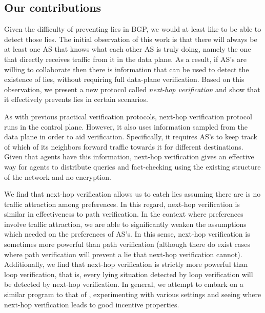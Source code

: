 \documentclass[10pt]{article}
\begin{document}
  \subsection{Our contributions}
    Given the difficulty of preventing lies in BGP,
    we would at least like to be able to detect those lies.
    The initial observation of this work is that
    there will always be at least one AS that knows what each
    other AS is truly doing, namely the one that directly receives traffic from
    it in the data plane.
    As a result, if AS's are willing to collaborate then there is
    information that can be used to detect the existence of lies, without
    requiring full data-plane verification.
    Based on this observation, we present a new protocol called
    \emph{next-hop verification}
    and show that it effectively prevents lies in certain scenarios.

    As with previous practical verification protocols,
    next-hop verification protocol runs in the control plane.
    However, it also uses
    information sampled from the data plane in order to aid verification.
    Specifically, it requires AS's to keep track of which of its neighbors
    forward traffic towards it for different destinations.
    Given that agents have this information, next-hop verification gives an
    effective way for agents to distribute queries and fact-checking
    using the existing structure of the network and no encryption.

    We find that next-hop verification allows us to catch lies assuming
    there are is no traffic attraction among preferences.
    In this regard, next-hop verification is similar in effectiveness to 
    path verification.
    In the context where preferences involve traffic attraction,
    we are able to significantly weaken the assumptions which
    \cite{Attraction} needed on the preferences of AS's.
    In this sense, next-hop verification is sometimes more powerful
    than path verification (although there do exist cases where
    path verification will prevent a lie that next-hop verification cannot).
    Additionally, we find that next-hop verification is strictly more
    powerful than loop verification, that is, every lying situation detected
    by loop verification will be detected by next-hop verification.
    In general, we attempt to embark on a similar program to that of
    \cite{Attraction}, experimenting with various settings and seeing
    where next-hop verification leads to good incentive properties.
\end{document}
